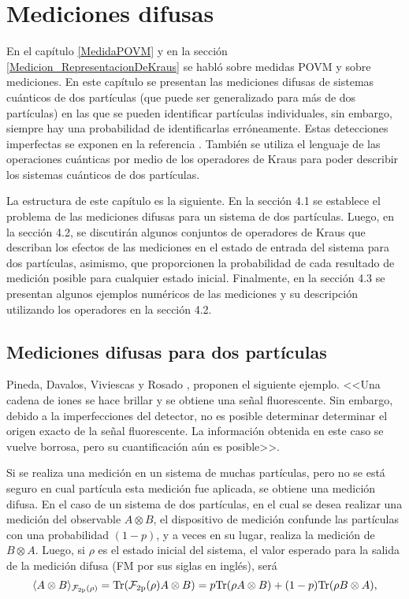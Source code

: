 \chapter{Mediciones difusas}


En el capítulo {\ref{MedidaPOVM}} y en la sección {\ref{Medicion_RepresentacionDeKraus}} se habló sobre medidas POVM y sobre mediciones. En este capítulo se presentan las mediciones difusas de sistemas cuánticos de dos partículas (que puede ser generalizado para más de dos partículas) en las que se pueden identificar partículas individuales, sin embargo, siempre hay una probabilidad de identificarlas erróneamente. Estas detecciones imperfectas se exponen en la referencia {\cite{Pineda_2021}}. También se utiliza el lenguaje de las operaciones cuánticas por medio de los operadores de Kraus para poder describir los sistemas cuánticos de dos partículas.

La estructura de este capítulo es la siguiente. En la sección 4.1 se establece el problema de las mediciones difusas para un sistema de dos partículas. Luego, en la sección 4.2, se discutirán algunos conjuntos de operadores de Kraus que describan los efectos de las mediciones en el estado de entrada del sistema para dos partículas, asimismo, que proporcionen la probabilidad de cada resultado de medición posible para cualquier estado inicial. Finalmente, en la sección 4.3 se presentan algunos ejemplos numéricos de las mediciones y su descripción utilizando los operadores en la sección 4.2.



\section{Mediciones difusas para dos partículas}

Pineda, Davalos, Viviescas y Rosado {\cite{Pineda_2021}}, proponen el siguiente ejemplo. <<Una cadena de iones se hace brillar  y se obtiene una señal fluorescente. Sin embargo, debido a la imperfecciones del detector, no es posible determinar
determinar el origen exacto de la señal fluorescente. La información obtenida en este caso se vuelve borrosa, pero su cuantificación aún es posible>>.

Si se  realiza una  medición en un sistema de muchas partículas, pero no se está seguro en cual partícula esta medición fue aplicada, se obtiene una medición difusa. En el caso de un sistema de dos partículas, en el cual se desea realizar una medición del observable $A\otimes B$, el dispositivo de medición confunde las partículas con una probabilidad $(1-p)$, y a veces en su lugar, realiza la medición de $B\otimes A$. Luego, si $\rho$ es el estado inicial del sistema, el valor esperado para la salida de la medición difusa (FM por sus siglas en inglés), será 
\begin{equation}
    \langle A\otimes B\rangle_{\mathcal{F_{\text{2p}}(\rho)}}={\rm Tr}(\mathcal{F_{\text{2p}}(\rho)}A\otimes B)=p{\rm Tr}(\rho A\otimes B)+(1-p){\rm Tr}(\rho B\otimes A),
\end{equation}



